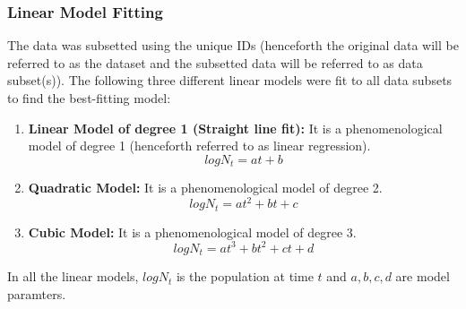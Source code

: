 \documentclass[11pt]{article}
\begin{document}
\subsubsection{Linear Model Fitting}
The data was subsetted using the unique IDs (henceforth the original data will be referred to as the dataset and the subsetted data will be referred to as data subset(s)). The following three different linear models were fit to all data subsets to find the best-fitting model:

\begin{enumerate}
    \item \textbf{Linear Model of degree 1 (Straight line fit):} It is a phenomenological model of degree 1 (henceforth referred to as linear regression). 
    \begin{equation}
        log N_{t} = at + b
    \end{equation}
    \item \textbf{Quadratic Model:} It is a phenomenological model of degree 2.
    \begin{equation}
        log N_{t} = at^{2} + bt + c
    \end{equation}
    \item \textbf{Cubic Model:} It is a phenomenological model of degree 3.
    \begin{equation}
        log N_{t} = at^{3} + bt^{2} + ct + d
    \end{equation}
\end{enumerate}

In all the linear models, $log N_{t}$ is the population at time $t$ and $a, b, c, d$ are model paramters. 
\end{document}

